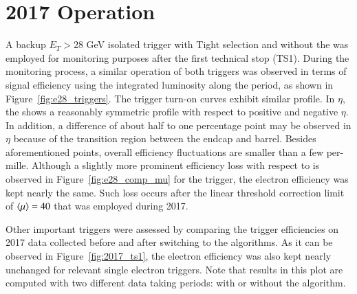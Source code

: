 \section{2017 Operation}\label{ssec:2017_ringer_operation}


A backup $E_T > 28$ GeV isolated trigger with Tight selection and without the \rnn{} was employed for
monitoring purposes after the first technical stop (TS1). During the monitoring process, a similar
operation of both triggers was observed in terms of signal efficiency using the
integrated luminosity along the period, as shown in
Figure~\ref{fig:e28_triggers}. The trigger
turn-on curves exhibit similar profile. In $\eta$, the \rnn{} shows a reasonably symmetric
profile with respect to positive and negative $\eta$. In addition, a difference of about half to one percentage point may be observed in $\eta$ because of the transition region between the endcap and barrel. Besides
aforementioned points, overall efficiency fluctuations are smaller than a few
per-mille. Although a slightly more prominent efficiency loss with respect to
\avgmu{} is observed in Figure~\ref{fig:e28_comp_mu} for the \rnn{} trigger, the
electron efficiency was kept nearly the same. Such loss occurs after the
linear threshold correction limit of $\langle \mu \rangle=40$ that was employed during 2017.

Other important triggers were assessed by comparing the trigger efficiencies on
2017 data collected before and after switching to the \rnn{} algorithms.  As it can be observed in Figure~\ref{fig:2017_ts1}, the electron efficiency was also kept nearly unchanged for relevant single electron triggers. Note that results in
this plot are computed with two different data taking periods: with or
without the \rnn{} algorithm. %




